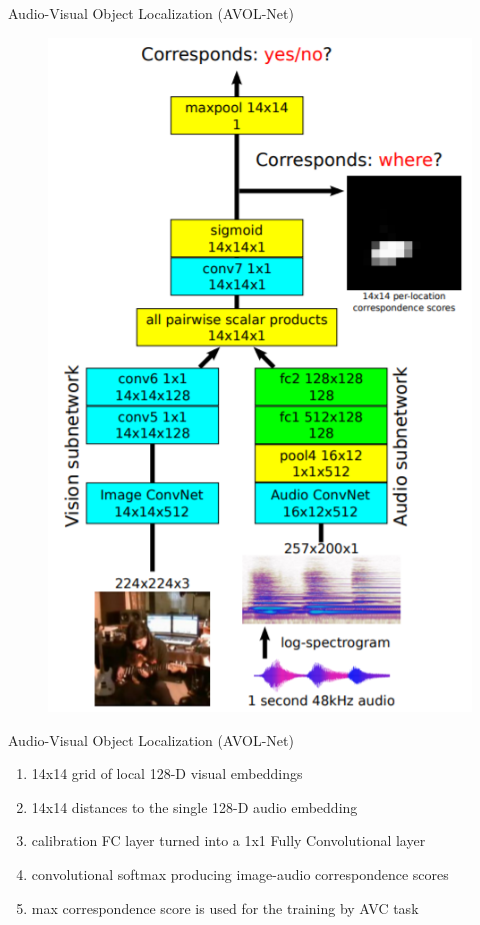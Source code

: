 \documentclass{beamer}
\begin{document}
\begin{frame}{Audio-Visual Object Localization (AVOL-Net)}

\begin{figure}[h]
\includegraphics[scale=0.5]{img/avol-net}
\caption{}
\end{figure}

\end{frame}
\begin{frame}{Audio-Visual Object Localization (AVOL-Net)}
\begin{enumerate}
\item 14x14 grid of local 128-D visual embeddings
\item 14x14 distances to the single 128-D audio embedding
\item calibration FC layer turned into a 1x1 Fully Convolutional layer
\item convolutional softmax producing image-audio correspondence scores
\item max correspondence score is used for the training by AVC task
\end{enumerate}
\end{frame}
\end{document}
